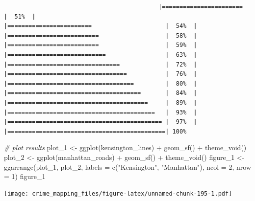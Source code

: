 \documentclass[
  krantz2]{krantz}
\makeatletter
\newenvironment{Shaded}{\begin{snugshade}}{\end{snugshade}}
\newcommand{\AttributeTok}[1]{\textcolor[rgb]{0.61,0.61,0.61}{#1}}
\newcommand{\CommentTok}[1]{\textcolor[rgb]{0.37,0.37,0.37}{\textit{#1}}}
\newcommand{\DecValTok}[1]{\textcolor[rgb]{0.06,0.06,0.06}{#1}}
\newcommand{\FunctionTok}[1]{\textcolor[rgb]{0,0,0}{#1}}
\newcommand{\NormalTok}[1]{#1}
\newcommand{\OtherTok}[1]{\textcolor[rgb]{0.37,0.37,0.37}{#1}}
\newcommand{\SpecialCharTok}[1]{\textcolor[rgb]{0,0,0}{#1}}
\newcommand{\StringTok}[1]{\textcolor[rgb]{0.5,0.5,0.5}{#1}}
\newenvironment{kframe}{%
\medskip{}
\setlength{\fboxsep}{.8em}
 \def\at@end@of@kframe{}%
 \ifinner\ifhmode%
  \def\at@end@of@kframe{\end{minipage}}%
  \begin{minipage}{\columnwidth}%
 \fi\fi%
 \def\FrameCommand##1{\hskip\@totalleftmargin \hskip-\fboxsep
 \colorbox{shadecolor}{##1}\hskip-\fboxsep
     \hskip-\linewidth \hskip-\@totalleftmargin \hskip\columnwidth}%
 \MakeFramed {\advance\hsize-\width
   \@totalleftmargin\z@ \linewidth\hsize
   \@setminipage}}%
 {\par\unskip\endMakeFramed%
 \at@end@of@kframe}
\renewenvironment{Shaded}{\begin{kframe}}{\end{kframe}}
\makeatother
\begin{document}
\begin{verbatim}
                                            |=======================                      |  51%  |                                                     |========================                     |  54%  |                                                     |==========================                   |  58%  |                                                     |==========================                   |  59%  |                                                     |============================                 |  63%  |                                                     |================================             |  72%  |                                                     |==================================           |  76%  |                                                     |====================================         |  80%  |                                                     |======================================       |  84%  |                                                     |========================================     |  89%  |                                                     |==========================================   |  93%  |                                                     |============================================ |  97%  |                                                     |=============================================| 100%
\end{verbatim}

\begin{Shaded}
\begin{Highlighting}[]
\CommentTok{\# plot results }
\NormalTok{plot\_1 }\OtherTok{\textless{}{-}} \FunctionTok{ggplot}\NormalTok{(kensington\_lines) }\SpecialCharTok{+} \FunctionTok{geom\_sf}\NormalTok{() }\SpecialCharTok{+} \FunctionTok{theme\_void}\NormalTok{()}
\NormalTok{plot\_2 }\OtherTok{\textless{}{-}} \FunctionTok{ggplot}\NormalTok{(manhattan\_roads) }\SpecialCharTok{+} \FunctionTok{geom\_sf}\NormalTok{() }\SpecialCharTok{+} \FunctionTok{theme\_void}\NormalTok{()}
\NormalTok{figure\_1 }\OtherTok{\textless{}{-}} \FunctionTok{ggarrange}\NormalTok{(plot\_1, plot\_2, }\AttributeTok{labels =} \FunctionTok{c}\NormalTok{(}\StringTok{"Kensington"}\NormalTok{, }\StringTok{"Manhattan"}\NormalTok{),}
                    \AttributeTok{ncol =} \DecValTok{2}\NormalTok{, }\AttributeTok{nrow =} \DecValTok{1}\NormalTok{)}
\NormalTok{figure\_1}
\end{Highlighting}
\end{Shaded}

\texttt{[image: crime\_mapping\_files/figure-latex/unnamed-chunk-195-1.pdf]}
\end{document}

